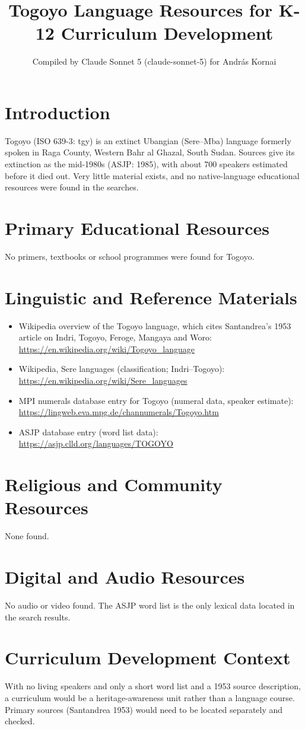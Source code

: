 \documentclass[12pt]{article}
\title{Togoyo Language Resources for K-12 Curriculum Development}
\author{Compiled by Claude Sonnet 5 (claude-sonnet-5) for Andr\'as Kornai}
\date{}
\begin{document}
\maketitle
\section{Introduction}
Togoyo (ISO 639-3: tgy) is an extinct Ubangian (Sere--Mba) language formerly spoken in Raga County, Western Bahr al Ghazal, South Sudan. Sources give its extinction as the mid-1980s (ASJP: 1985), with about 700 speakers estimated before it died out. Very little material exists, and no native-language educational resources were found in the searches.
\section{Primary Educational Resources}
No primers, textbooks or school programmes were found for Togoyo.
\section{Linguistic and Reference Materials}
\begin{itemize}
\item Wikipedia overview of the Togoyo language, which cites Santandrea's 1953 article on Indri, Togoyo, Feroge, Mangaya and Woro: \url{https://en.wikipedia.org/wiki/Togoyo_language}
\item Wikipedia, Sere languages (classification; Indri--Togoyo): \url{https://en.wikipedia.org/wiki/Sere_languages}
\item MPI numerals database entry for Togoyo (numeral data, speaker estimate): \url{https://lingweb.eva.mpg.de/channumerals/Togoyo.htm}
\item ASJP database entry (word list data): \url{https://asjp.clld.org/languages/TOGOYO}
\end{itemize}
\section{Religious and Community Resources}
None found.
\section{Digital and Audio Resources}
No audio or video found. The ASJP word list is the only lexical data located in the search results.
\section{Curriculum Development Context}
With no living speakers and only a short word list and a 1953 source description, a curriculum would be a heritage-awareness unit rather than a language course. Primary sources (Santandrea 1953) would need to be located separately and checked.
\end{document}
